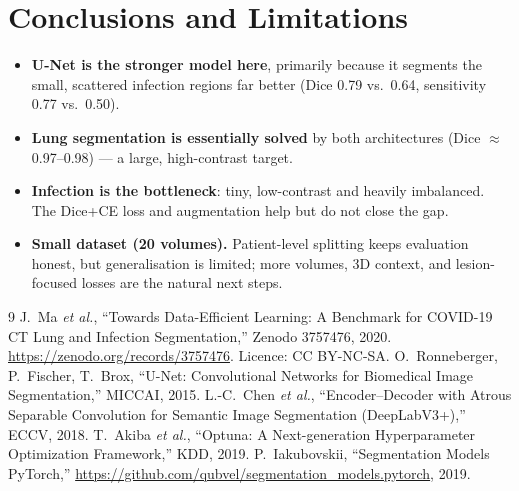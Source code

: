 \documentclass[11pt,a4paper]{article}
\begin{document}
\section{Conclusions and Limitations}
\begin{itemize}
  \item \textbf{U-Net is the stronger model here}, primarily because it segments the small,
        scattered infection regions far better (Dice 0.79 vs.\ 0.64, sensitivity 0.77 vs.\ 0.50).
  \item \textbf{Lung segmentation is essentially solved} by both architectures
        (Dice $\approx$ 0.97--0.98) --- a large, high-contrast target.
  \item \textbf{Infection is the bottleneck}: tiny, low-contrast and heavily imbalanced.
        The Dice+CE loss and augmentation help but do not close the gap.
  \item \textbf{Small dataset (20 volumes).} Patient-level splitting keeps evaluation honest,
        but generalisation is limited; more volumes, 3D context, and lesion-focused losses are
        the natural next steps.
\end{itemize}

\begin{thebibliography}{9}
 J.~Ma \emph{et al.}, ``Towards Data-Efficient Learning: A Benchmark for
  COVID-19 CT Lung and Infection Segmentation,'' Zenodo 3757476, 2020.
  \url{https://zenodo.org/records/3757476}. Licence: CC BY-NC-SA.
 O.~Ronneberger, P.~Fischer, T.~Brox, ``U-Net: Convolutional Networks for
  Biomedical Image Segmentation,'' MICCAI, 2015.
 L.-C.~Chen \emph{et al.}, ``Encoder--Decoder with Atrous Separable
  Convolution for Semantic Image Segmentation (DeepLabV3+),'' ECCV, 2018.
 T.~Akiba \emph{et al.}, ``Optuna: A Next-generation Hyperparameter
  Optimization Framework,'' KDD, 2019.
 P.~Iakubovskii, ``Segmentation Models PyTorch,''
  \url{https://github.com/qubvel/segmentation_models.pytorch}, 2019.
\end{thebibliography}
\end{document}
